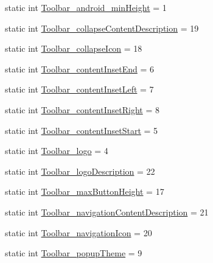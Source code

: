 \begin{DoxyCompactItemize}
\item 
static int \hyperlink{classandroid_1_1support_1_1v7_1_1cardview_1_1R_1_1styleable_afbb49f332c51e210fbfa15d408af281d}{Toolbar\+\_\+android\+\_\+min\+Height} = 1
\item 
static int \hyperlink{classandroid_1_1support_1_1v7_1_1cardview_1_1R_1_1styleable_a7f64c62bccb20000a1ce0dead70df1b9}{Toolbar\+\_\+collapse\+Content\+Description} = 19
\item 
static int \hyperlink{classandroid_1_1support_1_1v7_1_1cardview_1_1R_1_1styleable_a8eb012775ab40a813cfab4b5965dbc11}{Toolbar\+\_\+collapse\+Icon} = 18
\item 
static int \hyperlink{classandroid_1_1support_1_1v7_1_1cardview_1_1R_1_1styleable_a7b083162c37953ab9198af4e458c5c85}{Toolbar\+\_\+content\+Inset\+End} = 6
\item 
static int \hyperlink{classandroid_1_1support_1_1v7_1_1cardview_1_1R_1_1styleable_afa00957dff7d0d6a25908e2bb3a2b56c}{Toolbar\+\_\+content\+Inset\+Left} = 7
\item 
static int \hyperlink{classandroid_1_1support_1_1v7_1_1cardview_1_1R_1_1styleable_a9029bc8fbf941277cd67da6b7fd92668}{Toolbar\+\_\+content\+Inset\+Right} = 8
\item 
static int \hyperlink{classandroid_1_1support_1_1v7_1_1cardview_1_1R_1_1styleable_ac1839a6fcec9ba5ef65e542846ca28a7}{Toolbar\+\_\+content\+Inset\+Start} = 5
\item 
static int \hyperlink{classandroid_1_1support_1_1v7_1_1cardview_1_1R_1_1styleable_ac5bdebe83f2a68287e8ab3f0ddb5920c}{Toolbar\+\_\+logo} = 4
\item 
static int \hyperlink{classandroid_1_1support_1_1v7_1_1cardview_1_1R_1_1styleable_a8faae4fbd9959da0d13b10544ea5be98}{Toolbar\+\_\+logo\+Description} = 22
\item 
static int \hyperlink{classandroid_1_1support_1_1v7_1_1cardview_1_1R_1_1styleable_a26e906d28bad0693208a7f57617b8316}{Toolbar\+\_\+max\+Button\+Height} = 17
\item 
static int \hyperlink{classandroid_1_1support_1_1v7_1_1cardview_1_1R_1_1styleable_a1530a92c6708dc96b49416ed9e722bc5}{Toolbar\+\_\+navigation\+Content\+Description} = 21
\item 
static int \hyperlink{classandroid_1_1support_1_1v7_1_1cardview_1_1R_1_1styleable_af69916d5ccab7224ea96ec17a90ccc6a}{Toolbar\+\_\+navigation\+Icon} = 20
\item 
static int \hyperlink{classandroid_1_1support_1_1v7_1_1cardview_1_1R_1_1styleable_a8d28e7c348452dd4d2e1736a96d0e624}{Toolbar\+\_\+popup\+Theme} = 9

\end{DoxyCompactItemize}
